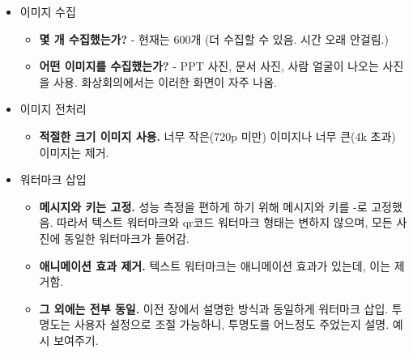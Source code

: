 \begin{itemize}
    \item 이미지 수집
    \begin{itemize}
        \item \textbf{몇 개 수집했는가?} - 현재는 600개 (더 수집할 수 있음. 시간 오래 안걸림.)
        \item \textbf{어떤 이미지를 수집했는가?} - PPT 사진, 문서 사진, 사람 얼굴이
        나오는 사진을 사용. 화상회의에서는 이러한 화면이 자주 나옴.
    \end{itemize}
    \item 이미지 전처리
    \begin{itemize}
        \item \textbf{적절한 크기 이미지 사용.} 너무 작은(720p 미만) 이미지나 너무 큰(4k
        초과) 이미지는 제거.
    \end{itemize}
    \item 워터마크 삽입
    \begin{itemize}
        \item \textbf{메시지와 키는 고정.}  성능 측정을 편하게 하기 위해 메시지와
        키를 -로 고정했음. 따라서 텍스트 워터마크와 qr코드 워터마크 형태는 변하지
        않으며, 모든 사진에 동일한 워터마크가 들어감.
        \item \textbf{애니메이션 효과 제거.} 텍스트 워터마크는 애니메이션 효과가
        있는데, 이는 제거함.
        \item \textbf{그 외에는 전부 동일.} 이전 장에서 설명한 방식과 동일하게
        워터마크 삽입. 투명도는 사용자 설정으로 조절 가능하니, 투명도를 어느정도
        주었는지 설명. 예시 보여주기.

\end{itemize}
\end{itemize}
